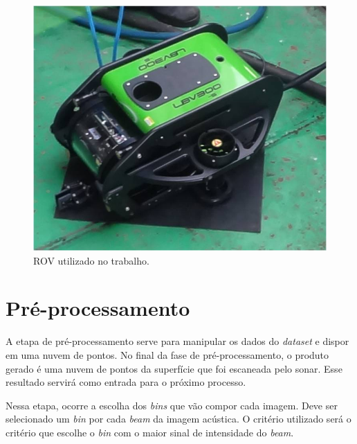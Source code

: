 \begin{figure}[H]
    \centering
    \caption{ROV utilizado no trabalho.}
    \label{fig:rov_nautec}
    \includegraphics[scale=0.5]{dados/figuras/rov_furg.jpg}
\end{figure}

\section{Pré-processamento}

A etapa de pré-processamento serve para manipular os dados do \textit{dataset} e dispor em uma nuvem de pontos.
No final da fase de pré-processamento, o produto gerado é uma nuvem de pontos da superfície que foi escaneada pelo sonar. Esse resultado servirá como entrada para o próximo processo.

Nessa etapa, ocorre a escolha dos \textit{bins} que vão compor cada imagem.
Deve ser selecionado um \textit{bin} por cada \textit{beam} da imagem acústica.
O critério utilizado será o critério que escolhe o \textit{bin} com o maior sinal de intensidade do \textit{beam}.

